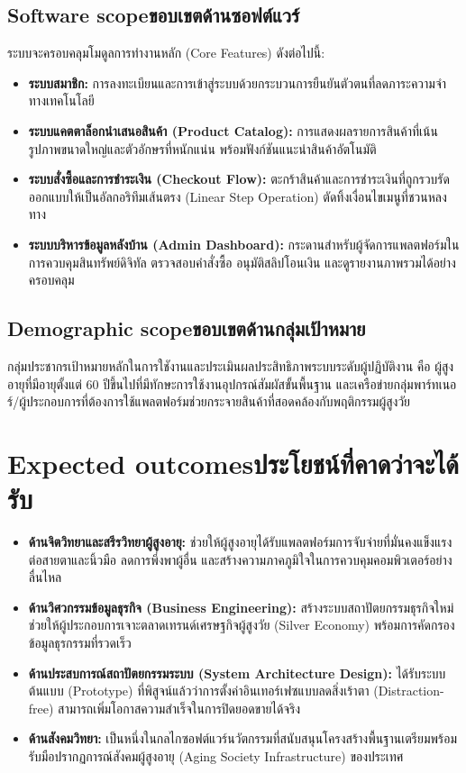\subsection{\ifenglish Software scope\else ขอบเขตด้านซอฟต์แวร์\fi}
ระบบจะครอบคลุมโมดูลการทำงานหลัก (Core Features) ดังต่อไปนี้:
\begin{itemize}
    \item \textbf{ระบบสมาชิก:} การลงทะเบียนและการเข้าสู่ระบบด้วยกระบวนการยืนยันตัวตนที่ลดภาระความจำทางเทคโนโลยี
    \item \textbf{ระบบแคตตาล็อกนำเสนอสินค้า (Product Catalog):} การแสดงผลรายการสินค้าที่เน้นรูปภาพขนาดใหญ่และตัวอักษรที่หนักแน่น พร้อมฟังก์ชันแนะนำสินค้าอัตโนมัติ
    \item \textbf{ระบบสั่งซื้อและการชำระเงิน (Checkout Flow):} ตะกร้าสินค้าและการชำระเงินที่ถูกรวบรัดออกแบบให้เป็นอัลกอริทึมเส้นตรง (Linear Step Operation) ตัดทิ้งเงื่อนไขเมนูที่ชวนหลงทาง
    \item \textbf{ระบบบริหารข้อมูลหลังบ้าน (Admin Dashboard):} กระดานสำหรับผู้จัดการแพลตฟอร์มในการควบคุมสินทรัพย์ดิจิทัล ตรวจสอบคำสั่งซื้อ อนุมัติสลิปโอนเงิน และดูรายงานภาพรวมได้อย่างครอบคลุม
\end{itemize}

\subsection{\ifenglish Demographic scope\else ขอบเขตด้านกลุ่มเป้าหมาย\fi}
กลุ่มประชากรเป้าหมายหลักในการใชังานและประเมินผลประสิทธิภาพระบบระดับผู้ปฏิบัติงาน คือ ผู้สูงอายุที่มีอายุตั้งแต่ 60 ปีขึ้นไปที่มีทักษะการใช้งานอุปกรณ์สัมผัสขั้นพื้นฐาน และเครือข่ายกลุ่มพาร์ทเนอร์/ผู้ประกอบการที่ต้องการใช้แพลตฟอร์มช่วยกระจายสินค้าที่สอดคล้องกับพฤติกรรมผู้สูงวัย

\section{\ifenglish Expected outcomes\else ประโยชน์ที่คาดว่าจะได้รับ\fi}
\begin{itemize}
    \item \textbf{ด้านจิตวิทยาและสรีรวิทยาผู้สูงอายุ:} ช่วยให้ผู้สูงอายุได้รับแพลตฟอร์มการจับจ่ายที่มั่นคงแข็งแรงต่อสายตาและนิ้วมือ ลดการพึ่งพาผู้อื่น และสร้างความภาคภูมิใจในการควบคุมคอมพิวเตอร์อย่างลื่นไหล
    \item \textbf{ด้านวิศวกรรมข้อมูลธุรกิจ (Business Engineering):} สร้างระบบสถาปัตยกรรมธุรกิจใหม่ ช่วยให้ผู้ประกอบการเจาะตลาดเทรนด์เศรษฐกิจผู้สูงวัย (Silver Economy) พร้อมการคัดกรองข้อมูลธุรกรรมที่รวดเร็ว
    \item \textbf{ด้านประสบการณ์สถาปัตยกรรมระบบ (System Architecture Design):} ได้รับระบบต้นแบบ (Prototype) ที่พิสูจน์แล้วว่าการตั้งค่าอินเทอร์เฟซแบบลดสิ่งเร้าตา (Distraction-free) สามารถเพิ่มโอกาสความสำเร็จในการปิดยอดขายได้จริง \cite{uxtrends2023}
    \item \textbf{ด้านสังคมวิทยา:} เป็นหนึ่งในกลไกซอฟต์แวร์นวัตกรรมที่สนับสนุนโครงสร้างพื้นฐานเตรียมพร้อมรับมือปรากฏการณ์สังคมผู้สูงอายุ (Aging Society Infrastructure) ของประเทศ
\end{itemize}

